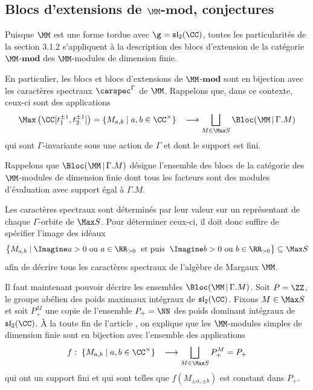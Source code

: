 %
\subsection{Blocs d'extensions de $\MM$-$\mathbf{mod}$, conjectures}

Puisque $\MM$ est une forme tordue avec $\g = \mathfrak{sl}_2(\CC)$, toutes les particularités de la section 3.1.2 s'appliquent à la description des blocs d'extension de la catégorie $\MM$-$\mathbf{mod}$ des $\MM$-modules de dimension finie.
 
En particulier, les blocs et blocs d'extensions de $\MM$-$\mathbf{mod}$ sont en bijection avec les caractères spectraux $\carspec^\Gamma$ de $\MM$. Rappelons que, dans ce contexte, ceux-ci sont des applications 
$$ \Max \left(\CC[t_1^{\pm 1},t_2^{\pm 1}]\right) = \{M_{a,b} \; | \; a,b \in \CC^\times \} \;\;\; \longrightarrow \bigsqcup_{M \in \Max S} \Bloc(\MM \, | \, \Gamma.M) $$ 
qui sont $\Gamma$-invariante sous une action de $\Gamma$ et dont le support est fini.

\begin{Rem} Rappelons que $\Bloc(\MM \, | \, \Gamma.M)$ désigne l'ensemble des blocs de la catégorie des $\MM$-modules de dimension finie dont tous les facteurs sont des modules d'évaluation avec support égal à $\Gamma.M$.
\end{Rem}

\begin{Rem} Les caractères spectraux sont déterminés par leur valeur sur un représentant de chaque $\Gamma$-orbite de $\Max S$. Pour déterminer ceux-ci, il doit donc suffire de spécifier l'image des idéaux 
$$ \big\{M_{a,b} \; | \; \Imagine a > 0 \text{ ou } a \in \RR_{> 0} \; \text{ et puis } \; \Imagine b > 0 \text{ ou } b \in \RR_{> 0} \big\} \subseteq \Max S $$
afin de décrire tous les caractères spectraux de l'algèbre de Margaux $\MM$.
\end{Rem}

Il faut maintenant pouvoir décrire les ensembles $\Bloc(\MM \, | \, \Gamma.M)$. Soit $P = \ZZ$, le groupe abélien des poids maximaux intégraux de $\mathfrak{sl}_2(\CC)$. Fixons $M \in \Max S$ et soit $P_+^M$ une copie de l'ensemble $P_+ = \NN$ des poids dominant intégraux de $\mathfrak{sl}_2(\CC)$. À la toute fin de l'article \cite{LPtfa}, on explique que les $\MM$-modules simples de dimension finie sont en bijection avec l'ensemble des applications 
$$ f : \; \{M_{a,b} \; | \; a,b \in \CC^\times \} \;\;\; \longrightarrow \bigsqcup_{M \in \Max S} P_+^M = P_+ $$ 
qui ont un support fini et qui sont telles que $f(M_{\pm a,\pm b})$ est constant dans $P_+$.

